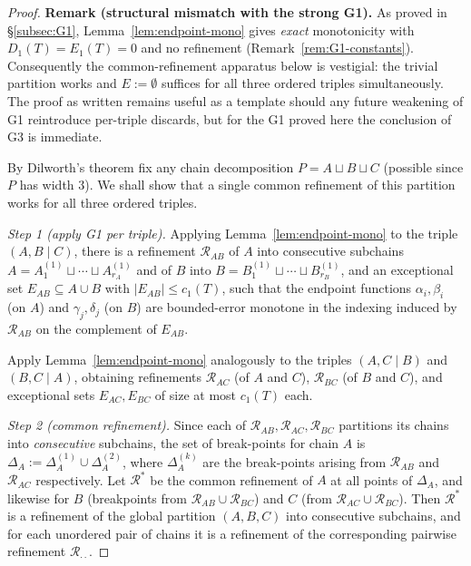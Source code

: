 \begin{proof}
\textbf{Remark (structural mismatch with the strong G1).}
As proved in §\ref{subsec:G1}, Lemma~\ref{lem:endpoint-mono} gives
\emph{exact} monotonicity with $D_1(T) = E_1(T) = 0$ and no refinement
(Remark~\ref{rem:G1-constants}). Consequently the common-refinement
apparatus below is vestigial: the trivial partition works and
$E := \emptyset$ suffices for all three ordered triples simultaneously.
The proof as written remains useful as a template should any future
weakening of G1 reintroduce per-triple discards, but for the G1 proved
here the conclusion of G3 is immediate.

By Dilworth's theorem fix any chain decomposition $P = A \sqcup B \sqcup C$
(possible since $P$ has width $3$). We shall show that a single common
refinement of this partition works for all three ordered triples.

\smallskip
\noindent\emph{Step 1 (apply G1 per triple).} Applying
Lemma~\ref{lem:endpoint-mono} to the triple $(A, B \mid C)$, there is a
refinement $\mathcal R_{AB}$ of $A$ into consecutive subchains
$A = A_1^{(1)} \sqcup \cdots \sqcup A_{r_A}^{(1)}$ and of $B$ into
$B = B_1^{(1)} \sqcup \cdots \sqcup B_{r_B}^{(1)}$, and an exceptional
set $E_{AB} \subseteq A \cup B$ with $|E_{AB}| \le c_1(T)$, such that the
endpoint functions $\alpha_i, \beta_i$ (on $A$) and $\gamma_j, \delta_j$
(on $B$) are bounded-error monotone in the indexing induced by
$\mathcal R_{AB}$ on the complement of $E_{AB}$.

Apply Lemma~\ref{lem:endpoint-mono} analogously to the triples
$(A, C \mid B)$ and $(B, C \mid A)$, obtaining refinements
$\mathcal R_{AC}$ (of $A$ and $C$), $\mathcal R_{BC}$ (of $B$ and $C$),
and exceptional sets $E_{AC}, E_{BC}$ of size at most $c_1(T)$ each.

\smallskip
\noindent\emph{Step 2 (common refinement).} Since each of
$\mathcal R_{AB}, \mathcal R_{AC}, \mathcal R_{BC}$ partitions its
chains into \emph{consecutive} subchains, the set of break-points for
chain $A$ is $\Delta_A := \Delta_A^{(1)} \cup \Delta_A^{(2)}$, where
$\Delta_A^{(k)}$ are the break-points arising from
$\mathcal R_{AB}$ and $\mathcal R_{AC}$ respectively. Let
$\mathcal R^*$ be the common refinement of $A$ at all points of
$\Delta_A$, and likewise for $B$ (breakpoints from
$\mathcal R_{AB} \cup \mathcal R_{BC}$) and $C$ (from
$\mathcal R_{AC} \cup \mathcal R_{BC}$). Then $\mathcal R^*$ is a
refinement of the global partition $(A,B,C)$ into consecutive subchains,
and for each unordered pair of chains it is a refinement of the
corresponding pairwise refinement $\mathcal R_{\cdot \cdot}$.


\end{proof}
